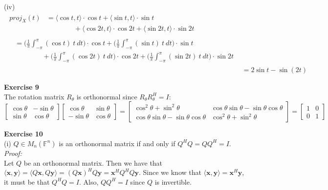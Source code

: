\documentclass[letterpaper,12pt]{article}
\let\vec\mathbf
\theoremstyle{definition}
\begin{document}
(iv)
\begin{align*}
  \begin{split}
    proj_X(t) &= \langle \cos t, t \rangle \cdot \cos t + \langle \sin t, t \rangle \cdot \sin t \\
    & \qquad \qquad + \langle \cos 2t, t \rangle \cdot \cos 2t + \langle \sin 2t, t \rangle \cdot \sin 2t
  \end{split} \\
  \begin{split}
    &= \Big(\frac{1}{\pi} \int_{-\pi}^\pi (\cos t) \ t \ dt \Big) \cdot \cos t +
    \Big(\frac{1}{\pi} \int_{-\pi}^\pi (\sin t) \ t \ dt \Big) \cdot \sin t \\
    & \qquad \qquad + \Big(\frac{1}{\pi} \int_{-\pi}^\pi (\cos 2t) \ t \ dt \Big) \cdot \cos 2t +
    \Big(\frac{1}{\pi} \int_{-\pi}^\pi (\sin 2t) \ t \ dt \Big) \cdot \sin 2t
  \end{split} \\
  &= 2\sin t - \sin(2t)
\end{align*}

\textbf{Exercise 9} \\
The rotation matrix $R_\mathcal{\theta}$ is orthonormal since $R_\mathcal{\theta}R_\mathcal{\theta}^H=I$:
\[
\begin{bmatrix}
  \cos \theta & -\sin \theta \\
  \sin \theta & \cos \theta
\end{bmatrix}
\begin{bmatrix}
  \cos \theta & \sin \theta \\
  -\sin \theta & \cos \theta
\end{bmatrix}
=
\begin{bmatrix}
  \cos^2 \theta + \sin^2 \theta & \cos \theta \sin \theta - \sin \theta \cos \theta \\
  \cos \theta \sin \theta - \sin \theta \cos \theta & \cos^2 \theta + \sin^2 \theta
\end{bmatrix}
=
\begin{bmatrix}
  1 & 0 \\
  0 & 1
\end{bmatrix}
\]

\textbf{Exercise 10} \\
(i) $Q \in M_n(\mathbb{F}^n)$ is an orthonormal matrix if and only if $Q^HQ=QQ^H=I$. \\
\textit{Proof:} \\
Let $Q$ be an orthonormal matrix. Then we have that $\langle \vec{x}, \vec{y} \rangle = \langle Q\vec{x},  Q\vec{y} \rangle = (Q\vec{x})^HQ\vec{y} = \vec{x}^HQ^HQ\vec{y}$. Since we know that $\langle \vec{x}, \vec{y} \rangle = \vec{x}^H\vec{y}$, it must be that $Q^HQ = I$. Also, $QQ^H = I$ since $Q$ is invertible.\\
\end{document}
